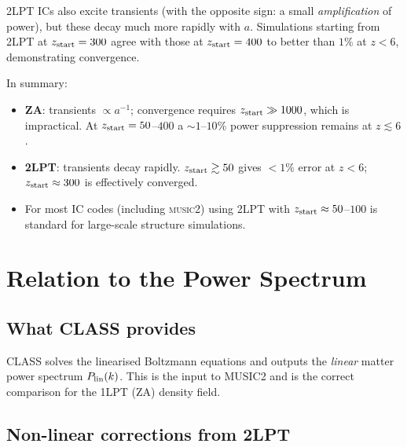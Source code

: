 \documentclass[12pt]{article}
\begin{document}
2LPT ICs also excite transients (with the opposite sign: a small
\emph{amplification} of power), but these decay much more rapidly
with $a$.  Simulations starting from 2LPT at $z_{\rm start}=300$
agree with those at $z_{\rm start}=400$ to better than $1\%$ at
$z<6$, demonstrating convergence.

\medskip
In summary:
\begin{itemize}
  \item \textbf{ZA}: transients $\propto a^{-1}$; convergence
    requires $z_{\rm start} \gg 1000$, which is impractical.
    At $z_{\rm start}=50$--$400$ a $\sim\!1$--$10\%$ power
    suppression remains at $z \lesssim 6$.
  \item \textbf{2LPT}: transients decay rapidly.
    $z_{\rm start} \gtrsim 50$ gives $<1\%$ error at $z<6$;
    $z_{\rm start} \approx 300$ is effectively converged.
  \item For most IC codes (including \textsc{music2}) using 2LPT
    with $z_{\rm start} \approx 50$--$100$ is standard for
    large-scale structure simulations.
\end{itemize}

\section{Relation to the Power Spectrum}
\label{sec:pk}

\subsection{What CLASS provides}

CLASS solves the linearised Boltzmann equations and outputs the
\emph{linear} matter power spectrum $P_{\rm lin}(k)$.  This is the
input to MUSIC2 and is the correct comparison for the 1LPT (ZA)
density field.

\subsection{Non-linear corrections from 2LPT}
\end{document}
